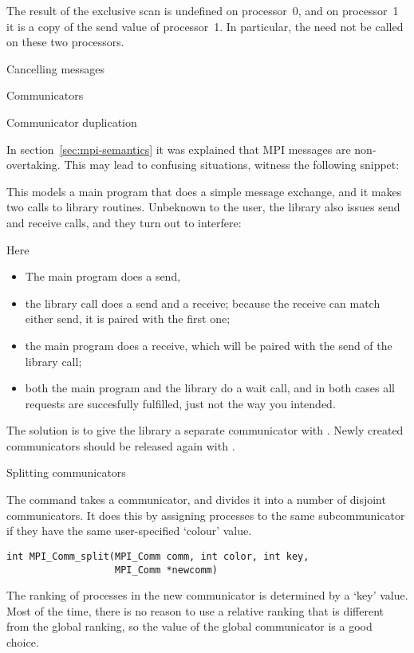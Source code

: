 The result of the exclusive scan is undefined on processor~0,
and on processor~1 it is a copy of the send value of processor~1.
In particular, the  need not be called on these two 
processors.

 {Cancelling messages}


 {Communicators}

 {Communicator duplication}

In section~\ref{sec:mpi-semantics} it was explained that MPI messages are 
non-overtaking. This may lead to confusing situations, witness the following snippet:


This models a main program that does a simple message exchange, and it
makes two calls to library routines. Unbeknown to the user, the library also issues send and receive calls, and they turn out to interfere:


Here
\begin{itemize}
\item The main program does a send,
\item the library call  does a send and a receive;
  because the receive can match either send, it is paired with the
  first one;
\item the main program does a receive, which will be paired with the send of the 
  library call;
\item both the main program and the library do a wait call, and in
  both cases all requests are succesfully fulfilled, just not the way
  you intended.
\end{itemize}

The solution is to give the library a separate communicator with
. Newly created communicators should be
released again with .


 {Splitting communicators}

The command  takes a communicator, and
divides it into a number of disjoint communicators. It does this by
assigning processes to the same subcommunicator if they have the same
user-specified `colour' value.
\begin{verbatim}
int MPI_Comm_split(MPI_Comm comm, int color, int key, 
                   MPI_Comm *newcomm)
\end{verbatim}
The ranking of processes in the new communicator is determined by a `key' value.
Most of the time, there is no reason to use a relative ranking that is different from
the global ranking, so the  value of the global communicator
is a good choice.

